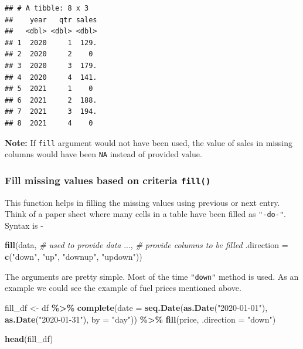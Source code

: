 \documentclass[
]{book}
\newenvironment{Shaded}{\begin{snugshade}}{\end{snugshade}}
\newcommand{\AttributeTok}[1]{\textcolor[rgb]{0.13,0.29,0.53}{#1}}
\newcommand{\CommentTok}[1]{\textcolor[rgb]{0.56,0.35,0.01}{\textit{#1}}}
\newcommand{\FunctionTok}[1]{\textcolor[rgb]{0.13,0.29,0.53}{\textbf{#1}}}
\newcommand{\NormalTok}[1]{#1}
\newcommand{\OtherTok}[1]{\textcolor[rgb]{0.56,0.35,0.01}{#1}}
\newcommand{\SpecialCharTok}[1]{\textcolor[rgb]{0.81,0.36,0.00}{\textbf{#1}}}
\newcommand{\StringTok}[1]{\textcolor[rgb]{0.31,0.60,0.02}{#1}}
\begin{document}
\begin{verbatim}
## # A tibble: 8 x 3
##    year   qtr sales
##   <dbl> <dbl> <dbl>
## 1  2020     1  129.
## 2  2020     2    0 
## 3  2020     3  179.
## 4  2020     4  141.
## 5  2021     1    0 
## 6  2021     2  188.
## 7  2021     3  194.
## 8  2021     4    0
\end{verbatim}

\textbf{Note:} If \texttt{fill} argument would not have been used, the value of sales in missing columns would have been \texttt{NA} instead of provided value.

\hypertarget{fill-missing-values-based-on-criteria-fill}{%
\subsubsection*{\texorpdfstring{Fill missing values based on criteria \texttt{fill()}}{Fill missing values based on criteria fill()}}\label{fill-missing-values-based-on-criteria-fill}}

This function helps in filling the missing values using previous or next entry. Think of a paper sheet where many cells in a table have been filled as \texttt{"-do-"}. Syntax is -

\begin{Shaded}
\begin{Highlighting}[]
\FunctionTok{fill}\NormalTok{(data, }\CommentTok{\# used to provide data}
\NormalTok{     ..., }\CommentTok{\# provide columns to be filled}
     \AttributeTok{.direction =} \FunctionTok{c}\NormalTok{(}\StringTok{"down"}\NormalTok{, }\StringTok{"up"}\NormalTok{, }\StringTok{"downup"}\NormalTok{, }\StringTok{"updown"}\NormalTok{))}
\end{Highlighting}
\end{Shaded}

The arguments are pretty simple. Most of the time \texttt{"down"} method is used. As an example we could see the example of fuel prices mentioned above.

\begin{Shaded}
\begin{Highlighting}[]
\NormalTok{fill\_df }\OtherTok{\textless{}{-}}\NormalTok{ df }\SpecialCharTok{\%\textgreater{}\%} 
  \FunctionTok{complete}\NormalTok{(}\AttributeTok{date =} \FunctionTok{seq.Date}\NormalTok{(}\FunctionTok{as.Date}\NormalTok{(}\StringTok{"2020{-}01{-}01"}\NormalTok{), }\FunctionTok{as.Date}\NormalTok{(}\StringTok{"2020{-}01{-}31"}\NormalTok{), }\AttributeTok{by =} \StringTok{"day"}\NormalTok{)) }\SpecialCharTok{\%\textgreater{}\%} 
  \FunctionTok{fill}\NormalTok{(price, }\AttributeTok{.direction =} \StringTok{"down"}\NormalTok{)}

\FunctionTok{head}\NormalTok{(fill\_df)}
\end{Highlighting}
\end{Shaded}
\end{document}
